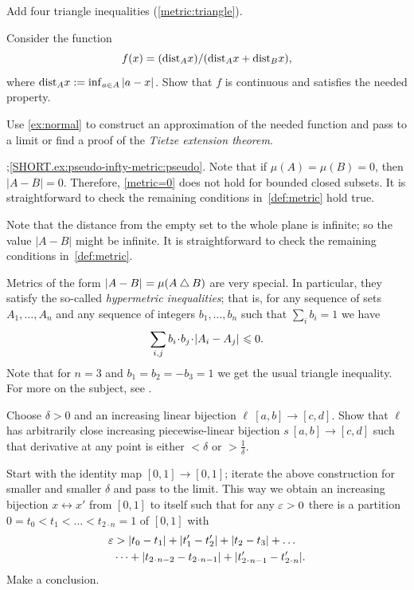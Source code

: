 \setcounter{eqtn}{0}

Add four triangle inequalities (\ref{metric:triangle}).

Consider the function 
\[f(x)=(\mathrm{dist}_Ax)/(\mathrm{dist}_Ax+\mathrm{dist}_Bx),\]
where $\distfun_Ax\z\df\inf_{a\in A}\dist{a}{x}{}$.
Show that $f$ is continuous and satisfies the needed property.

Use \ref{ex:normal} to construct an approximation of the needed function and pass to a limit or find a proof of the \emph{Tietze extension theorem}.

\parbf{\ref{ex:pseudo-infty-metric}};\ref{SHORT.ex:pseudo-infty-metric:pseudo}.
Note that if $\mu(A)=\mu(B)=0$, then $|A-B|=0$.
Therefore, \ref{metric=0} does not hold for bounded closed subsets.
It is straightforward to check the remaining conditions in~\ref{def:metric} hold true.

Note that the distance from the empty set to the whole plane is infinite; so the value $|A-B|$ might be infinite.
It is straightforward to check the remaining conditions in~\ref{def:metric}.

Metrics of the form $\dist{A}{B}{}=\mu(A\bigtriangleup B)$ are very special.
In particular, they satisfy the so-called \emph{hypermetric inequalities}; that is, for any sequence of sets $A_1,\dots, A_n$ and any sequence of integers $b_1,\dots,b_n$ such that $\sum_ib_i=1$ we have
\[\sum_{i,j}b_i\cdot b_j\cdot \dist{A_i}{A_j}{}\le 0.\]
Note that for $n=3$ and $b_1=b_2=-b_3=1$ we get the usual triangle inequality.
For more on the subject, see \cite{deza-laurent}.

Choose $\delta>0$ and an increasing linear bijection $\ell\:[a,b]\to [c,d]$.
Show that $\ell$ has arbitrarily close increasing piecewise-linear bijection $s\:[a,b]\to [c,d]$ such that derivative at any point is either $<\delta$ or $>\tfrac1\delta$.

Start with the identity map $[0,1]\to [0,1]$;
iterate the above construction for smaller and smaller $\delta$ and pass to the limit.
This way we obtain an increasing  bijection $x\leftrightarrow x'$ from $[0,1]$ to itself
such that for any $\varepsilon>0$ there is a partition $0=t_0<t_1<\dots <t_{2\cdot n}=1$ of $[0,1]$ with 
\begin{align*}
\eps&>|t_0-t_1|+|t_1'-t_2'|+|t_2-t_3|+\dots
\\
&\dots+|t_{2\cdot n-2}-t_{2\cdot n-1}|+|t_{2\cdot n-1}'-t_{2\cdot n}'|.
\end{align*}
Make a conclusion.

